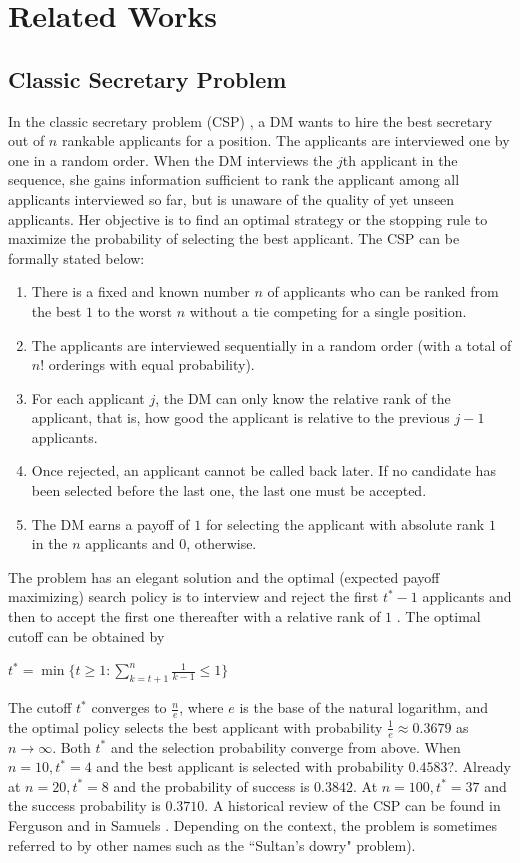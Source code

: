 \documentclass[conference]{IEEEtran}
\theoremstyle{definition}
\begin{document}
\section{Related Works} \label{related}
\subsection{Classic Secretary Problem}
In the classic secretary problem (CSP) \cite{CSP}, a DM wants to hire the best secretary out of $n$ rankable applicants for a position. The applicants are interviewed one by one in a random order.  When the DM interviews the $j$th applicant in the sequence, she gains information sufficient to rank the applicant among all applicants interviewed so far, but is unaware of the quality of yet unseen applicants.   Her objective is to find an optimal strategy or the stopping rule to maximize the probability of selecting the best applicant. The CSP can be formally stated below:


\begin{enumerate}
\item  There is a fixed and known number $n$ of applicants who can be ranked from the best $1$ to the worst $n$ without a tie competing for a single position.
\item The applicants are interviewed sequentially in a random order (with a total of $n!$ orderings with equal probability).
\item For each applicant $j$, the DM can only know the relative rank of the applicant, that is, how good the applicant is relative to the previous $j-1$ applicants.
\item Once rejected, an applicant cannot be called back later. If no candidate has been selected before the last one, the last one must be accepted.
\item The DM earns a payoff of $1$ for selecting the applicant with absolute rank $1$ in the $n$ applicants and $0$, otherwise.
\end{enumerate}


The problem has an elegant solution and the optimal (expected payoff maximizing) search policy is to interview and reject the first $t^{*}-1$ applicants and then to accept the first one thereafter with a relative rank of $1$ \cite{Gilbert1966}. The optimal cutoff can be obtained by

$t^{*} = \min \{t \geq 1: \sum_{k=t+1}^{n} \frac{1}{k-1} \leq 1\} $

The cutoff $t^{*}$ converges to $\frac {n}{e}$, where $e$ is the base of the natural logarithm, and the optimal policy selects the best applicant with probability $\frac {1} {e} \approx 0.3679$ as $n \rightarrow \infty$. Both $t^{*}$ and the selection probability converge from above. When $n=10, t^{*}=4$ and the best applicant is selected with probability $0.4583$?. Already at $n=20, t^{*}=8$ and the probability of success is $0.3842$. At $n=100, t^{*}=37$ and the success probability is $0.3710$. A historical review of the CSP can be found in Ferguson \cite{Ferguson1989} and in Samuels \cite{Samuels1992}. Depending on the context, the problem is sometimes referred to by other names such as the ``Sultan’s dowry" problem).
\end{document}
